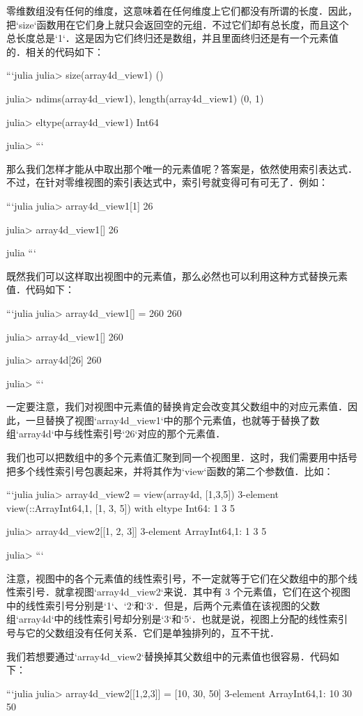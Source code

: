 零维数组没有任何的维度，这意味着在任何维度上它们都没有所谓的长度．因此，把`size`函数用在它们身上就只会返回空的元组．不过它们却有总长度，而且这个总长度总是`1`．这是因为它们终归还是数组，并且里面终归还是有一个元素值的．相关的代码如下：

```julia
julia> size(array4d_view1)
()

julia> ndims(array4d_view1), length(array4d_view1)
(0, 1)

julia> eltype(array4d_view1)
Int64

julia> 
```

那么我们怎样才能从中取出那个唯一的元素值呢？答案是，依然使用索引表达式．不过，在针对零维视图的索引表达式中，索引号就变得可有可无了．例如：

```julia
julia> array4d_view1[1]
26

julia> array4d_view1[]
26

julia
```

既然我们可以这样取出视图中的元素值，那么必然也可以利用这种方式替换元素值．代码如下：

```julia
julia> array4d_view1[] = 260
260

julia> array4d_view1[]
260

julia> array4d[26]
260

julia> 
```

一定要注意，我们对视图中元素值的替换肯定会改变其父数组中的对应元素值．因此，一旦替换了视图`array4d_view1`中的那个元素值，也就等于替换了数组`array4d`中与线性索引号`26`对应的那个元素值．

我们也可以把数组中的多个元素值汇聚到同一个视图里．这时，我们需要用中括号把多个线性索引号包裹起来，并将其作为`view`函数的第二个参数值．比如：

```julia
julia> array4d_view2 = view(array4d, [1,3,5])
3-element view(::Array{Int64,1}, [1, 3, 5]) with eltype Int64:
 1
 3
 5

julia> array4d_view2[[1, 2, 3]]
3-element Array{Int64,1}:
 1
 3
 5

julia> 
```

注意，视图中的各个元素值的线性索引号，不一定就等于它们在父数组中的那个线性索引号．就拿视图`array4d_view2`来说．其中有 3 个元素值，它们在这个视图中的线性索引号分别是`1`、`2`和`3`．但是，后两个元素值在该视图的父数组`array4d`中的线性索引号却分别是`3`和`5`．也就是说，视图上分配的线性索引号与它的父数组没有任何关系．它们是单独排列的，互不干扰．

我们若想要通过`array4d_view2`替换掉其父数组中的元素值也很容易．代码如下：

```julia
julia> array4d_view2[[1,2,3]] = [10, 30, 50]
3-element Array{Int64,1}:
 10
 30
 50

